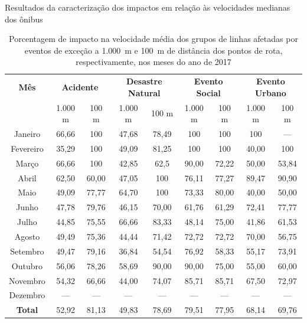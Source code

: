 \documentclass{beamer}
\begin{document}
\begin{frame}{Resultados da caracterização dos impactos em relação às velocidades medianas dos ônibus}
\begin{table}[!htb]
\centering
\caption {Porcentagem de impacto na velocidade média dos grupos de linhas afetadas por eventos de exceção a 1.000~m e 100~m de distância dos pontos de rota, respectivamente, nos meses do ano de 2017}
\label{tab:exceptEventVelocityImpAllShapes}
\begin{adjustbox}{max height=10mm, width=3.5in}
\begin{tabular}{c|cc|cc|cc|cc}
\toprule
\newline \textbf{Mês} & \multicolumn{2}{c}{\textbf{Acidente}} &
\multicolumn{2}{c}{\textbf{Desastre Natural}} & \multicolumn{2}{c}{\textbf{Evento Social}} &
\multicolumn{2}{c}{\textbf{Evento Urbano}}\\
\cmidrule(l){2-3} \cmidrule(l){4-5} \cmidrule(l){6-7} \cmidrule(l){8-9}
 & 1.000 m & 100 m & 1.000 m & 100 m & 1.000 m & 100 m & 1.000 m & 100 m \\
\midrule
Janeiro & 66,66 &  100 & 
 47,68 &  78,49 & 
 100 & 100 &
 100 & --- \\
\hline
Fevereiro & 35,29  &  100 &
 49,09 &  81,25 &
 100 & 100 &
 40,00 & 100 \\
\hline
Março  & 66,66  &  100 & 
 42,85 &  62,5 &
90,00 & 72,22 &
50,00 & 53,84 \\
\hline
Abril & 62,50 & 60,00 & 
47,05  & 100 & 
76,11 & 77,27 & 
89,47 &  90,90\\
\hline
Maio & 49,09 &  77,77 &
64,70 &  100 &
73,33 & 80,00 &
40,00 & 50,00 \\
\hline
Junho & 47,78 &  79,76 &
 46,15 &  70,00 &
 61,76 & 61,29 &
72,41 & 77,77 \\
\hline
Julho & 44,85  &  75,55 &
 66,66  & 83,33 &
48,14  & 75,00 &
41,86 & 61,53 \\
\hline
Agosto & 49,49 & 75,36 &
  44,44 & 71,42 &
  72,72 & 72,72 & 
70,00  & 56,75 \\
\hline
Setembro & 49,47  & 79,16 &
36,84  & 54,54 &
76,92  & 58,33 & 
55,17 & 73,91 \\
\hline
Outubro & 56,06 & 78,26 &
58,69  & 90,00 &
90,00  & 75,00 &
55,00 & 60,00 \\
\hline
Novembro & 54,32 & 66,66 &
 44,00 & 74,07 &
85,71  & 85,71 &
67,50  & 72,97 \\
\hline
Dezembro & --- & --- & --- & --- & --- & --- & --- & ---  \\
\midrule
\midrule
\textbf{Total} & 52,92 & 81,13 & 49,83 & 78,69 & 79,51 & 77,95 & 68,14 & 69,76  \\
\bottomrule
\end{tabular}
\end{adjustbox}
\end{table}
\end{frame}
\end{document}

